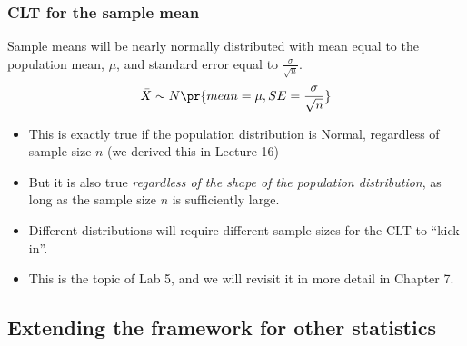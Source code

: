 \documentclass[t,compress,mathserif]{beamer}
\begin{document}

\begin{frame}
\frametitle{CLT for the sample mean}

{Sample means will be nearly normally distributed with mean equal to the population mean, $\mu$, and standard error equal to $\frac{\sigma}{\sqrt{n}}$.
\[ \bar{X} \sim N \pr{ mean = \mu, SE = \frac{\sigma}{\sqrt{n}} } \]
}

\begin{itemize}
    \item This is exactly true if the population distribution is Normal, regardless of sample size $n$ (we derived this in Lecture 16)
    \item But it is also true \emph{regardless of the shape of the population distribution}, as long as the sample size $n$ is sufficiently large.
    \item Different distributions will require different sample sizes for the CLT to ``kick in''.
    \item This is the topic of Lab 5, and we will revisit it in more detail in Chapter 7.
\end{itemize}

\end{frame}


\subsection{Extending the framework for other statistics}

\end{document}
